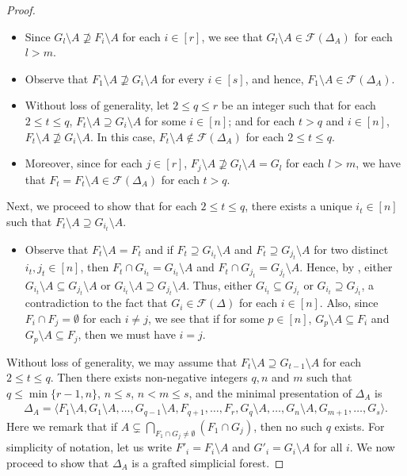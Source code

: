 \documentclass[12pt,a4paper,reqno]{amsart}
\theoremstyle{definition}
\def\D{\Delta}
\def\F{\mathcal{F}}
\def\l{\langle}
\def\r{\rangle}
\begin{document}
\begin{proof}
\begin{itemize}
         \item[$\bullet$] Since $G_l\setminus A\nsupseteq F_i\setminus A$ for each $i\in[r]$, we see that $G_l\setminus A\in\F(\Delta_{A})$ for each $l>m$.

         \item[$\bullet$] Observe that $F_1\setminus A\nsupseteq G_i\setminus A$ for every $i\in[s]$, and hence, $F_1\setminus A\in \F(\D_A)$.

         \item[$\bullet$] Without loss of generality, let $2\le q\le r$ be an integer such that for each $2\le t\le q$, $F_t\setminus A\supseteq G_i\setminus A$ for some $i\in[n]$; and for each $t>q$ and $i\in [n]$, $F_t\setminus A\nsupseteq G_i\setminus A$. In this case, $F_t\setminus A\notin \F(\Delta_{A})$ for each $2\leq t\le q$.

         \item[$\bullet$] Moreover, since for each $j\in [r]$, $F_j\setminus A\nsupseteq G_l\setminus A=G_l$ for each $l>m$, we have that $F_t=F_t\setminus A\in\F(\Delta_{A})$ for each $t>q$.
     \end{itemize}
     
           Next, we proceed to show that for each $2\le t\le q$, there exists a unique $i_t\in [n]$ such that $F_t\setminus A\supseteq G_{i_t}\setminus A$. 
           
           \begin{itemize}
               \item[$\bullet$] Observe that $F_t\setminus A=F_t$ and if $F_t\supseteq G_{i_t}\setminus A$ and $F_t\supseteq G_{j_t}\setminus A$ for two distinct $i_t,j_t\in[n]$, then $F_t\cap G_{i_t}=G_{i_t}\setminus A$ and $F_t\cap G_{j_t}=G_{j_t}\setminus A$. Hence, by , either $G_{i_t}\setminus A\subseteq G_{j_t}\setminus A$ or $G_{i_t}\setminus A\supseteq G_{j_t}\setminus A$. Thus, either $G_{i_t}\subseteq G_{j_t}$ or $G_{i_t}\supseteq G_{j_t}$, a contradiction to the fact that $G_i\in\F(\Delta)$ for each $i\in[n]$. Also, since $F_i\cap F_j=\emptyset$ for each $i\neq j$, we see that if for some $p\in [n]$, $G_p\setminus A\subseteq F_i$ and $G_p\setminus A\subseteq F_j$, then we must have $i=j$.
           \end{itemize}
            Without loss of generality, we may assume that $F_t\setminus A\supseteq G_{t-1}\setminus A$ for each $2\le t\le q$. Then there exists non-negative integers $q,n$ and $m$ such that $ q\le \min\{r-1,n\}$, $ n\le s$, $n< m\le s$, and the minimal presentation of $\Delta_{A}$ is 
    \begin{align}\label{equation 52}
    \Delta_{A}=\l F_1\setminus A,G_1\setminus A,\ldots,G_{q-1}\setminus A,F_{q+1},\ldots,F_r,G_{q}\setminus A,\ldots,G_n\setminus A,G_{m+1},\ldots,G_s\r.
    \end{align}
    Here we remark that if $A\subsetneq \bigcap_{F_1\cap G_j\neq\emptyset}(F_1\cap G_j)$, then no such $q$ exists. For simplicity of notation, let us write $F'_i=F_i\setminus A$ and $G'_i=G_i\setminus A$ for all $i$. We now proceed to show that $\Delta_A$ is a grafted simplicial forest.
    

\end{proof}
\end{document}
